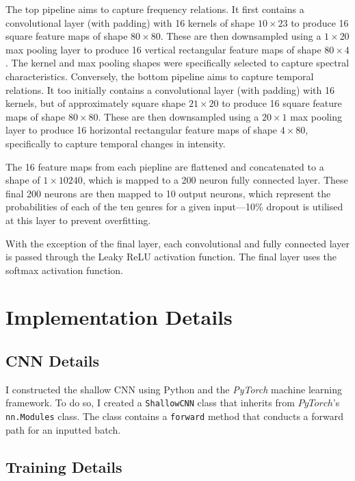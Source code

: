 \documentclass[conference]{IEEEtran}
\begin{document}
The top pipeline aims to capture frequency relations.
It first contains a convolutional layer (with padding) with 16 kernels of shape $10\times23$ to produce 16 square feature maps of shape $80\times80$.
These are then downsampled using a $1\times20$ max pooling layer to produce 16 vertical rectangular feature maps of shape $80\times4$.
The kernel and max pooling shapes were specifically selected to capture spectral characteristics.
Conversely, the bottom pipeline aims to capture temporal relations.
It too initially contains a convolutional layer (with padding) with 16 kernels, but of approximately square shape $21\times20$ to produce 16 square feature maps of shape $80\times80$.
These are then downsampled using a $20\times1$ max pooling layer to produce 16 horizontal rectangular feature maps of shape $4\times80$, specifically to capture temporal changes in intensity.

The 16 feature maps from each piepline are flattened and concatenated to a shape of $1\times10240$, which is mapped to a 200 neuron fully connected layer.
These final 200 neurons are then mapped to 10 output neurons, which represent the probabilities of each of the ten genres for a given input---10\% dropout is utilised at this layer to prevent overfitting.

With the exception of the final layer, each convolutional and fully connected layer is passed through the Leaky ReLU activation function.
The final layer uses the softmax activation function.

\section{Implementation Details}

\subsection{CNN Details}

I constructed the shallow CNN using Python and the \textit{PyTorch} \cite{PyTorch} machine learning framework.
To do so, I created a \texttt{ShallowCNN} class that inherits from $PyTorch$'s \texttt{nn.Modules} class.
The class contains a \texttt{forward} method that conducts a forward path for an inputted batch.

\subsection{Training Details}
\end{document}
